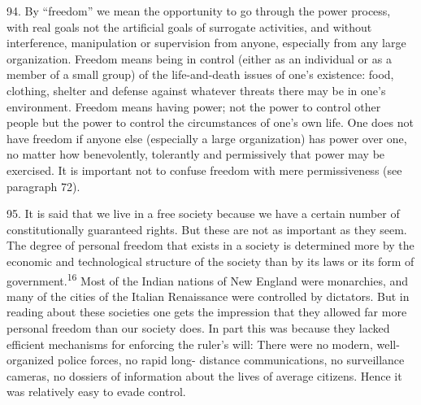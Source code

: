 \documentclass{article}
\begin{document}
94.  By “freedom” we mean the opportunity to go through the power process, with real goals not 
the  artificial  goals  of  surrogate  activities,  and  without  interference,  manipulation  or  supervision  
from anyone, especially from any large organization.  Freedom means being in control (either as 
an  individual  or  as  a  member  of  a  small  group)  of  the  life-and-death  issues  of  one’s  existence:  
food, clothing, shelter and defense against whatever threats there may be in one’s 
environment.  Freedom means having power; not the power to control other people but the power 
to  control  the  circumstances  of  one’s  own  life.   One  does  not  have  freedom  if  anyone  else  
(especially a large organization) has power over one, no matter how benevolently, tolerantly and 
permissively  that  power  may  be  exercised.   It  is  important  not  to  confuse  freedom  with  mere  
permissiveness (see paragraph 72). \vspace{\baselineskip}

95.  It is said that we live in a free society because we have a certain number of constitutionally 
guaranteed rights.  But these are not as important as they seem.  The degree of personal freedom 
that  exists  in  a  society  is  determined  more  by  the  economic  and  technological  structure  of  the  
society than by its laws or its form of government.\textsuperscript{16} Most of the Indian nations of New England 
were monarchies, and many of the cities of the Italian Renaissance were controlled by dictators.  But in reading about these societies one gets the impression that they allowed far more 
personal freedom than our society does.  In part this was because they lacked efficient mechanisms 
for enforcing the ruler’s will: There were no modern, well-organized police forces, no rapid long-
distance communications, no surveillance cameras, no dossiers of information about the lives of 
average citizens.  Hence it was relatively easy to evade control. \vspace{\baselineskip}
\end{document}
